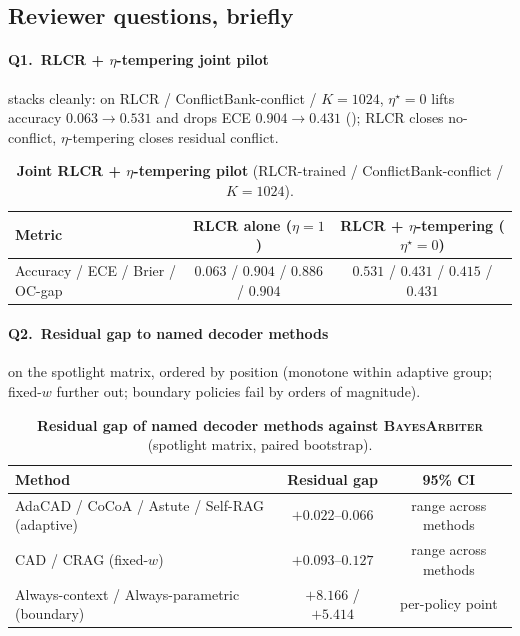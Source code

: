 \subsection{Reviewer questions, briefly}
\label{app:reviewer-qa}

\paragraph{Q1.\ RLCR + $\eta$-tempering joint pilot} stacks cleanly:
on RLCR / ConflictBank-conflict / $K\!=\!1024$, $\eta^\star\!=\!0$
lifts accuracy $0.063\!\to\!0.531$ and drops ECE $0.904\!\to\!0.431$
(); RLCR closes no-conflict,
$\eta$-tempering closes residual conflict.

\begin{table}[H]
\centering\small
\caption{\textbf{Joint RLCR + $\eta$-tempering pilot}
(RLCR-trained / ConflictBank-conflict / $K\!=\!1024$).}
\label{tab:rlcr-joint-pilot}
\setlength{\tabcolsep}{6pt}
\begin{tabular}{lcc}
\toprule
\textbf{Metric} & \textbf{RLCR alone ($\eta\!=\!1$)} & \textbf{RLCR + $\eta$-tempering ($\eta^\star\!=\!0$)}\\
\midrule
Accuracy / ECE / Brier / OC-gap
& $0.063$ / $0.904$ / $0.886$ / $0.904$
& $\mathbf{0.531}$ / $\mathbf{0.431}$ / $\mathbf{0.415}$ / $\mathbf{0.431}$\\
\bottomrule
\end{tabular}
\end{table}

\paragraph{Q2.\ Residual gap to named decoder methods} on the
spotlight matrix, ordered by  position
(monotone within adaptive group; fixed-$w$ further out; boundary
policies fail by orders of magnitude).

\begin{table}[H]
\centering\small
\caption{\textbf{Residual gap of named decoder methods against
\textsc{BayesArbiter}} (spotlight matrix, paired bootstrap).}
\label{tab:special-cases-residual}
\setlength{\tabcolsep}{4pt}
\begin{tabular}{lcc}
\toprule
\textbf{Method} & \textbf{Residual gap} & \textbf{95\% CI}\\
\midrule
AdaCAD / CoCoA / Astute / Self-RAG (adaptive)
& $+0.022$--$0.066$ & range across methods\\
CAD / CRAG (fixed-$w$)
& $+0.093$--$0.127$ & range across methods\\
Always-context / Always-parametric (boundary)
& $+8.166$ / $+5.414$ & per-policy point\\
\bottomrule
\end{tabular}
\end{table}

